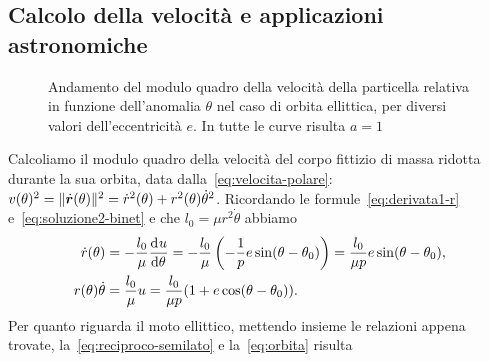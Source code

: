 \subsection{Calcolo della velocità e applicazioni astronomiche}
\label{sec:velocita}
\begin{figure}
  \centering
  
  \caption[Andamento della velocità in funzione dell'anomalia vera]{Andamento
    del modulo quadro della velocità della particella relativa in funzione
    dell'anomalia $\theta$ nel caso di orbita ellittica, per diversi valori
    dell'eccentricità $e$. In tutte le curve risulta $a=1$}
  \label{fig:velocita}
\end{figure}
Calcoliamo il modulo quadro della velocità del corpo fittizio di massa ridotta
durante la sua orbita, data dalla~\eqref{eq:velocita-polare}: $v(\theta)^2 =
\lVert\dot{\bm{r}}(\theta)\rVert^2 = \dot{r}^2(\theta) +
r^2(\theta)\dot{\theta}^2$. Ricordando le formule~\eqref{eq:derivata1-r}
e~\eqref{eq:soluzione2-binet} e che $l_0=\mu r^2\dot{\theta}$ abbiamo
\begin{subequations}
  \begin{align}
    \dot{r}(\theta) &= -\frac{l_0}{\mu}\frac{{\mathop{}\!\mathrm{d}^{}}u}{\mathop{}\!\mathrm{d} {\theta}^{}} = -\frac{l_0}{\mu}
    \left( -\frac{1}{p}e\sin(\theta-\theta_0) \right) = \frac{l_0}{\mu p}e
    \sin(\theta - \theta_0), \label{eq:velocita-radiale} \\
    r(\theta)\dot{\theta} &= \frac{l_0}{\mu}u =
    \frac{l_0}{\mu p}(1+e\cos(\theta-\theta_0)). \label{eq:velocita-tangenziale}
  \end{align}
\end{subequations}
Per quanto riguarda il moto ellittico, mettendo insieme le relazioni appena
trovate, la~\eqref{eq:reciproco-semilato} e la~\eqref{eq:orbita} risulta
